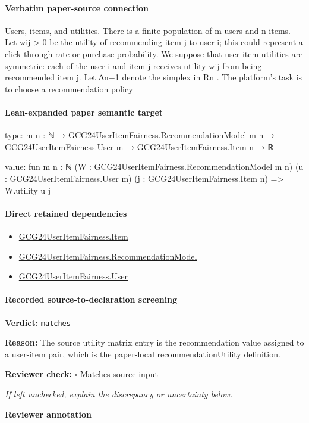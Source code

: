 \documentclass[10pt]{article}
\newcommand{\reviewerbox}{%
  \par\noindent\fbox{\parbox{0.96\linewidth}{\rule{0pt}{0.38in}}}\par
}
\newcommand{\reviewmatch}[1]{%
  \par\noindent\textbf{Reviewer check:} $\square$\; #1\par
  \noindent\emph{If left unchecked, explain the discrepancy or uncertainty below.}\par
}
\begin{document}
\paragraph{Verbatim paper-source connection}
\begin{ReviewVerbatim}
Users, items, and utilities. There is a finite population of m users and n items. Let wij > 0 be
the utility of recommending item j to user i; this could represent a click-through rate or purchase
probability. We suppose that user-item utilities are symmetric: each of the user i and item j receives
utility wij from being recommended item j.
Let ∆n−1 denote the simplex in Rn . The platform’s task is to choose a recommendation policy
\end{ReviewVerbatim}



\paragraph{Lean-expanded paper semantic target}
\begin{ReviewVerbatim}
type:
{m n : ℕ} →
  GCG24UserItemFairness.RecommendationModel m n → GCG24UserItemFairness.User m → GCG24UserItemFairness.Item n → ℝ

value:
fun {m n : ℕ} (W : GCG24UserItemFairness.RecommendationModel m n) (u : GCG24UserItemFairness.User m)
    (j : GCG24UserItemFairness.Item n) =>
  W.utility u j
\end{ReviewVerbatim}

\paragraph{Direct retained dependencies}
\begin{itemize}\raggedright
\item \hyperlink{governing-declaration-a7c560a429c6e204}{GCG24\allowbreak{}User\allowbreak{}Item\allowbreak{}Fairness.\allowbreak{}Item}
\item \hyperlink{governing-declaration-4b845f20f80fb146}{GCG24\allowbreak{}User\allowbreak{}Item\allowbreak{}Fairness.\allowbreak{}Recommendation\allowbreak{}Model}
\item \hyperlink{governing-declaration-800dd691bc989470}{GCG24\allowbreak{}User\allowbreak{}Item\allowbreak{}Fairness.\allowbreak{}User}
\end{itemize}
\paragraph{Recorded source-to-declaration screening}
\textbf{Verdict:} \texttt{matches}
\\
{\raggedright
\textbf{Reason:} The source utility matrix entry is the recommendation value assigned to a user-\allowbreak{}item pair, which is the paper-\allowbreak{}local recommendationUtility definition.\allowbreak{}
\par}
\reviewmatch{Matches source input}
\noindent\textbf{Reviewer annotation}\par
\reviewerbox
\clearpage
\hypertarget{paper-prerequisite-4b6f9efb494da04e}{}
\end{document}
